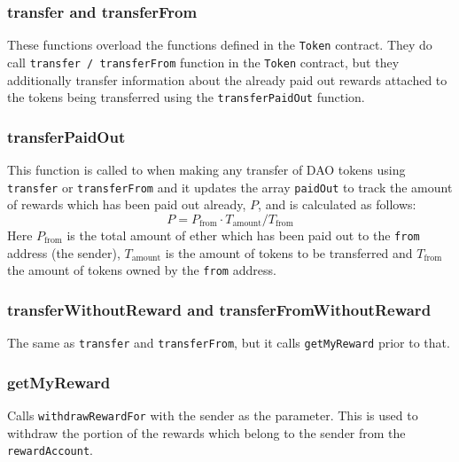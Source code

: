 \documentclass[9pt,oneside]{amsart}
\begin{document}
\begin{multicols}{2}
\subsubsection*{transfer and transferFrom}
These functions overload the functions defined in the \verb|Token| contract. They do call \verb|transfer / transferFrom| function in the \verb|Token| contract, but they additionally transfer information about the already paid out rewards attached to the tokens being transferred using the \verb|transferPaidOut| function. 

\subsubsection*{transferPaidOut}
This function is called to when making any transfer of DAO tokens using \verb|transfer| or \verb|transferFrom| and it updates the array \verb|paidOut| to track the amount of rewards which has been paid out already, $P$, and is calculated as follows:
\begin{equation}
 P = P_{\text{from}} \cdot T_{\text{amount}} / T_{\text{from}}
\end{equation}
Here $P_{\text{from}}$ is the total amount of ether which has been paid out to the \verb|from| address (the sender), $T_{\text{amount}}$ is the amount of tokens to be transferred and $T_{\text{from}}$ the amount of tokens owned by the \verb|from| address.

\subsubsection*{transferWithoutReward and transferFromWithoutReward}
The same as \verb|transfer| and \verb|transferFrom|, but it calls \verb|getMyReward| prior to that.

\subsubsection*{getMyReward}
Calls \verb|withdrawRewardFor| with the sender as the parameter. This is used to withdraw the portion of the rewards which belong to the sender from the \verb|rewardAccount|.


\end{multicols}
\end{document}
